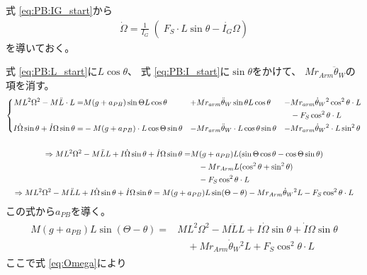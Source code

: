 \documentclass[a4paper,11pt]{jsarticle}
\begin{document}
式 \ref{eq:PB:IG_start}から
\begin{gather}
  \dot{\Omega} = 
  \left.\frac{1}{I_G}\middle(
    F_S \cdot L\sin\theta
    -\dot{I_G}\Omega
  \right)
  \label{eq:Omega}
\end{gather}
を導いておく。

式 \ref{eq:PB:L_start}に$L\cos\theta$、
式 \ref{eq:PB:I_start}に$\sin\theta$をかけて、
$Mr_{Arm}\ddot{\theta}_W$の項を消す。
\begin{gather}
  \left\{
  \begin{aligned}  
    ML^2\Omega^2 - M\ddot{L} \cdot L
    =& M(g+a_{PB})\sin\Theta L\cos\theta
    &+& Mr_{arm}\ddot{\theta}_W\sin\theta L\cos\theta
    &-& Mr_{arm}\dot{\theta}_W{}^2\cos^2\theta \cdot L
    \\
    &&&&&- F_S\cos^2\theta \cdot L
    \\
    I\dot\Omega \sin\theta + \dot{I}\Omega \sin\theta
    =& -M(g+a_{PB}) \cdot L\cos\Theta \sin\theta
    &-& Mr_{arm}\ddot{\theta}_W \cdot L \cos\theta \sin\theta
    &-& Mr_{arm}\dot{\theta}_W{}^2 \cdot L \sin^2\theta
  \end{aligned}
  \right.
  \notag
  \\
  \quad \notag
  \\
  \begin{aligned}
    \Rightarrow
    ML^2\Omega^2 - M\ddot{L}L + I\dot\Omega \sin\theta + \dot{I}\Omega \sin\theta
    =& M(g+a_{PB}) L(\sin\Theta \cos\theta - \cos\Theta \sin\theta)
    \\
    &\quad - Mr_{Arm}L(\cos^2\theta + \sin^2\theta)
    \\
    &\quad - F_S\cos^2\theta \cdot L
  \end{aligned}
  \notag
  \\
  \Rightarrow
  ML^2\Omega^2 - M\ddot{L}L + I\dot\Omega \sin\theta + \dot{I}\Omega \sin\theta
  =
  M(g+a_{PB}) L\sin(\Theta - \theta) - Mr_{Arm}\dot{\theta}_W{}^2L - F_S\cos^2\theta \cdot L
  \notag
\end{gather}
この式から$a_{PB}$を導く。
\begin{align}
  \begin{aligned}
    M(g+a_{PB}) L\sin(\Theta - \theta)
    =&
    ML^2\Omega^2 - M\ddot{L}L + I\dot\Omega \sin\theta + \dot{I}\Omega \sin\theta
    \\
    &\quad + Mr_{Arm}\dot{\theta}_W{}^2L + F_S\cos^2\theta \cdot L
  \end{aligned}
\end{align}
ここで式 \ref{eq:Omega}により
\end{document}
